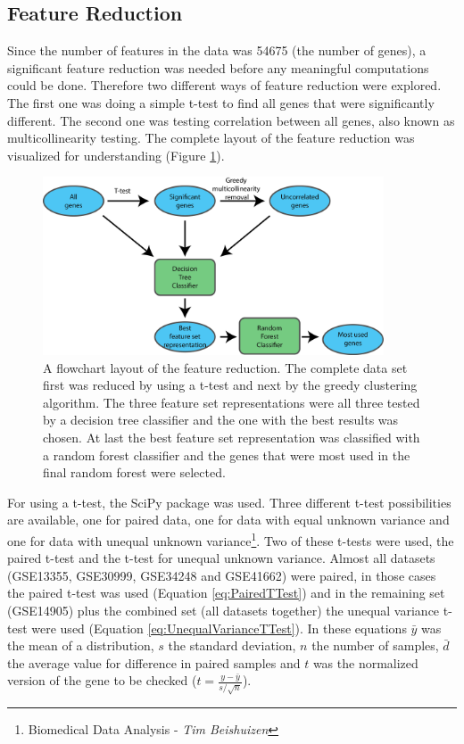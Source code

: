 \documentclass[10pt,a4paper]{article}
\begin{document}
	\subsection{Feature Reduction}
	\label{subsec:MethodsFeatureReduction}
	
	Since the number of features in the data was 54675 (the number of genes), a significant feature reduction was needed before any meaningful computations could be done. Therefore two different ways of feature reduction were explored. The first one was doing a simple t-test to find all genes that were significantly different. The second one was testing correlation between all genes, also known as multicollinearity testing. The complete layout of the feature reduction was visualized for understanding (Figure \ref{fig:FeatureReductionLayout}).
	
	\begin{figure}[H]
		\includegraphics[width=0.9\textwidth]{FeatureReductionLayout.png}
		\caption{A flowchart layout of the feature reduction. The complete data set first was reduced by using a t-test and next by the greedy clustering algorithm. The three feature set representations were all three tested by a decision tree classifier and the one with the best results was chosen. At last the best feature set representation was classified with a random forest classifier and the genes that were most used in the final random forest were selected.}
		\label{fig:FeatureReductionLayout}
	\end{figure}
		
	
	For using a t-test, the SciPy package was used. Three different t-test possibilities are available, one for paired data, one for data with equal unknown variance and one for data with unequal unknown variance\footnote{\label{fn:BDA}Biomedical Data Analysis - \textit{Tim Beishuizen}}. Two of these t-tests were used, the paired t-test and the t-test for unequal unknown variance. Almost all datasets (GSE13355, GSE30999, GSE34248 and GSE41662) were paired, in those cases the paired t-test was used (Equation \ref{eq:PairedTTest}) and in the remaining set (GSE14905) plus the combined set (all datasets together) the unequal variance t-test were used (Equation \ref{eq:UnequalVarianceTTest}). In these equations $\bar{y}$ was the mean of a distribution, $s$ the standard deviation, $n$ the number of samples, $\bar{d}$ the average value for difference in paired samples and $t$ was the normalized version of the gene to be checked ($t = \frac{y - \bar{y}}{s/\sqrt{n}}$).  
	
\end{document}
